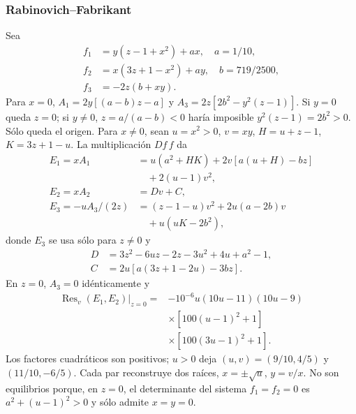 \subsubsection{Rabinovich--Fabrikant}
Sea
\begin{equation}
 \begin{aligned}
 f_1&=y(z-1+x^2)+ax,\quad a=1/10,\\
 f_2&=x(3z+1-x^2)+ay,\quad b=719/2500,\\
 f_3&=-2z(b+xy).
 \end{aligned}
 \label{bre:geo:rf}
\end{equation}
Para $x=0$, $A_1=2y[(a-b)z-a]$ y
$A_3=2z[2b^2-y^2(z-1)]$. Si $y=0$ queda $z=0$; si $y\ne0$,
$z=a/(a-b)<0$ haría imposible $y^2(z-1)=2b^2>0$. Sólo queda el
origen. Para $x\ne0$, sean $u=x^2>0$, $v=xy$, $H=u+z-1$,
$K=3z+1-u$. La multiplicación $Df\,f$ da
\begin{equation}
 \begin{aligned}
 E_1=xA_1&=u(a^2+HK)+2v[a(u+H)-bz]\\
         &\quad+2(u-1)v^2,\\
 E_2=xA_2&=Dv+C,\\
 E_3=-uA_3/(2z)&=(z-1-u)v^2+2u(a-2b)v\\
               &\quad+u(uK-2b^2),
 \end{aligned}
 \label{bre:geo:rf-reduced}
\end{equation}
donde $E_3$ se usa sólo para $z\ne0$ y
\begin{equation}
 \begin{aligned}
 D&=3z^2-6uz-2z-3u^2+4u+a^2-1,\\
 C&=2u[a(3z+1-2u)-3bz].
 \end{aligned}
 \label{bre:geo:rf-DC}
\end{equation}
En $z=0$, $A_3=0$ idénticamente y
\begin{equation}
 \begin{aligned}
 \operatorname{Res}_v(E_1,E_2)|_{z=0}
 ={}&-10^{-6}u(10u-11)(10u-9)\\
 &\times[100(u-1)^2+1]\\
 &\times[100(3u-1)^2+1].
 \end{aligned}
 \label{bre:geo:rf-z0}
\end{equation}
Los factores cuadráticos son positivos; $u>0$ deja
$(u,v)=(9/10,4/5)$ y $(11/10,-6/5)$. Cada par reconstruye dos
raíces, $x=\pm\sqrt u$, $y=v/x$. No son equilibrios porque, en
$z=0$, el determinante del sistema $f_1=f_2=0$ es
$a^2+(u-1)^2>0$ y sólo admite $x=y=0$.

